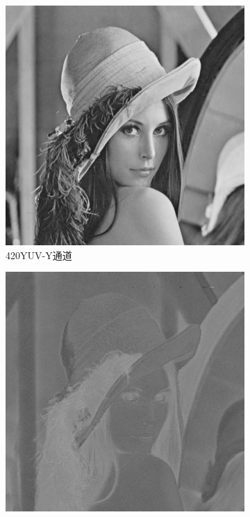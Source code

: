 \begin{figure}[ht]
    \begin{subfigure}{0.245\textwidth}
      \includegraphics[width=\linewidth]{pages/jpeg/yuv420-y.jpg}
      \caption{420YUV-Y通道}
      \label{Fig:RGB2YUV-y}
    \end{subfigure}
    \begin{subfigure}{0.245\textwidth}
      \includegraphics[width=\linewidth]{pages/jpeg/yuv420-u.jpg}

\end{subfigure}
\end{figure}
